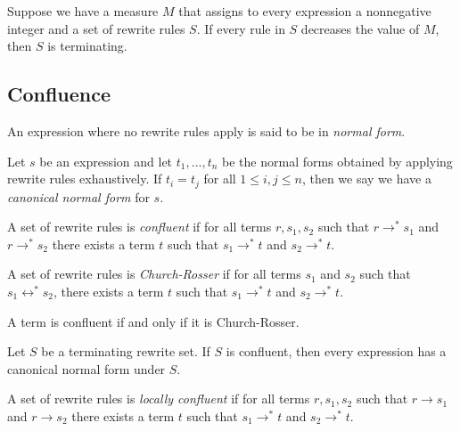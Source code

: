 \documentclass{article}
\begin{document}
\begin{theorem}
	Suppose we have a measure $M$ that assigns to every expression a nonnegative integer and
	a set of rewrite rules $S$. If every rule in $S$ decreases the value of $M$, then $S$
	is terminating.
\end{theorem}

\subsection{Confluence}

\begin{definition}
	An expression where no rewrite rules apply is said to be in \emph{normal form}.
\end{definition}

\begin{definition}
	Let $s$ be an expression and let $t_1, ..., t_n$ be the normal forms obtained by
	applying rewrite rules exhaustively. If $t_i=t_j$ for all $1\leq i,j\leq n$, then we
	say we have a \emph{canonical normal form} for $s$.
\end{definition}

\begin{definition}
	A set of rewrite rules is \emph{confluent} if for all terms $r,s_1,s_2$ such that
	$r\to^*s_1$ and $r\to^*s_2$ there exists a term $t$ such that
	$s_1\to^*t$ and $s_2\to^*t$.
\end{definition}

\begin{definition}
	A set of rewrite rules is \emph{Church-Rosser} if for all terms $s_1$ and $s_2$
	such that $s_1\leftrightarrow^* s_2$, there exists a term $t$ such that $s_1\to^*t$
	and $s_2\to^* t$.
\end{definition}

\begin{theorem}
	A term is confluent if and only if it is Church-Rosser.
\end{theorem}

\begin{theorem}
	Let $S$ be a terminating rewrite set. If $S$ is confluent, then every expression has a
	canonical normal form under $S$.
\end{theorem}

\begin{definition}
	A set of rewrite rules is \emph{locally confluent} if for all terms $r,s_1,s_2$ such that
	$r\to s_1$ and $r\to s_2$ there exists a term $t$ such that
	$s_1\to^*t$ and $s_2\to^*t$.
\end{definition}
\end{document}
